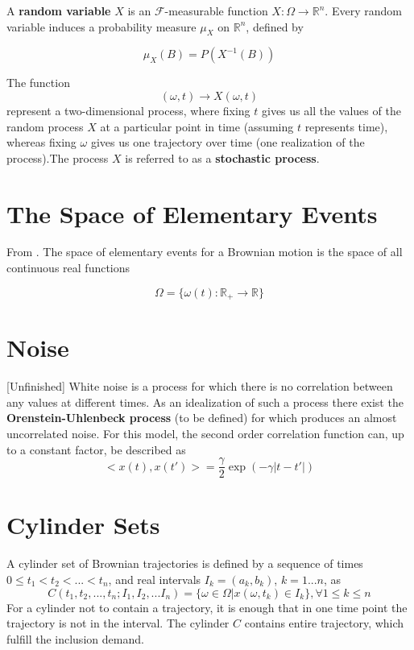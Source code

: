 \documentclass[12pt]{report}
\begin{document}
A \textbf{random variable} $X$ is an $\mathcal{F}$-measurable function $X:\Omega\rightarrow \mathbb{R}^n$. Every random variable induces a probability measure $\mu_X$ on $\mathbb{R}^n$, defined by 

\begin{equation*}
\mu_X(B) = P(X^{-1}(B))
\end{equation*}

The function 
\begin{equation*}
(\omega,t)\rightarrow X(\omega,t)
\end{equation*}
represent a two-dimensional process, where fixing $t$ gives us all the values of the random process $X$ at a particular point in time (assuming $t$ represents time), whereas fixing $\omega$ gives us one trajectory over time (one realization of the process).The process $X$ is referred to as a \textbf{stochastic process}.


\section{The Space of Elementary Events}
From \cite{schuss2009theory}. The space of elementary events for a Brownian motion is the space of all continuous real functions 

\begin{equation*}
\Omega=\{\omega(t):\mathbb{R}_+\rightarrow\mathbb{R}\}
\end{equation*}


\section{Noise}[Unfinished]
White noise is a process for which there is no correlation between any values at different times. As an idealization of such a process there exist the \textbf{Orenstein-Uhlenbeck process} (to be defined) for which produces an almost uncorrelated noise. For this model, the second order correlation function can, up to a constant factor, be described as 
\begin{equation*}
<x(t),x(t')>= \frac{\gamma}{2}\exp(-\gamma|t-t'|)
\end{equation*}

\section{Cylinder Sets}
A cylinder set of Brownian trajectories is defined by a sequence of times $0\leq t_1<t_2<...<t_n$, and real intervals $I_k=(a_k,b_k)$, $k=1...n$, as 
\begin{equation*}
C(t_1,t_2,...,t_n;I_1,I_2,...I_n)=\{\omega\in \Omega|x(\omega,t_k)\in I_k\},\forall 1\leq k \leq n
\end{equation*}
For a cylinder not to contain a trajectory, it is enough that in one time point the trajectory is not in the interval.
The cylinder $C$ contains entire trajectory, which fulfill the inclusion demand. 
\end{document}
